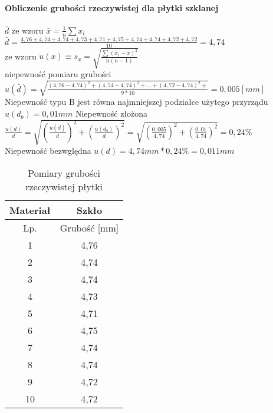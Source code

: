 \documentclass[a4paper,10pt,twoside]{article}
\begin{document}
	\paragraph{Obliczenie grubości rzeczywistej dla płytki szklanej} 
	$\bar{d}$ ze wzoru $\bar{x} = \frac{1}{n} \sum x_i$ \\
	$\bar{d} = \frac{4,76 +
		4,74 +
		4,74 +
		4,73 +
		4,71 +
		4,75 +
		4,74 +
		4,74 +
		4,72 +
		4,72
	}{10} = 4,74
	$ \\
	ze wzoru $u(x) \equiv s_x = \sqrt{\frac{\sum(x_i - \bar{x})^2}{n(n-1)}}$ \\niepewność pomiaru grubości\\ $u(\bar{d}) = \sqrt{\frac{(4,76-4,74)^2 + (4,74-4,74)^2 + ... +(4,72-4,74)^2 +}{9*10}} = 0,005[mm] $
	\\ Niepewność typu B jest równa najmniejszej podziałce użytego przyrządu $u(d_b)= 0,01mm$
	Niepewność złożona $\frac{u(d)}{d} = \sqrt{(\frac{u(\bar{d})}{d})^2 + (\frac{u(d_b)}{d})^2} =\sqrt{(\frac{0,005}{4,74})^2 + (\frac{0,01}{4,74})^2} = 0,24\%$
	\\Niepewność bezwględna $u(d) = 4,74mm * 0,24\% = 0,011mm$  
	\begin{table}[!htbp]
		\caption{Pomiary grubości rzeczywistej płytki}
		\begin{center}
			\begin{tabular}{|c|c|}
				\hline
				Materiał & Szkło \\ \hline
				Lp. & Grubość {[}mm{]} \\ \hline
				1 & 4,76 \\ \hline
				2 & 4,74 \\ \hline
				3 & 4,74 \\ \hline
				4 & 4,73 \\ \hline
				5 & 4,71 \\ \hline
				6 & 4,75 \\ \hline
				7 & 4,74 \\ \hline
				8 & 4,74 \\ \hline
				9 & 4,72 \\ \hline
				10 & 4,72 \\ \hline
			\end{tabular}
		\end{center}
	\end{table}
\end{document}
